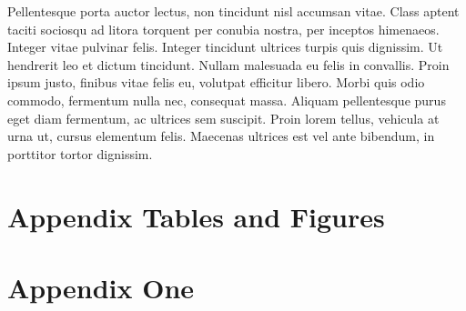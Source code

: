 \documentclass[12pt]{article}
\begin{document}
Pellentesque porta auctor lectus, non tincidunt nisl accumsan vitae. Class aptent taciti sociosqu ad litora torquent per conubia nostra, per inceptos himenaeos. Integer vitae pulvinar felis. Integer tincidunt ultrices turpis quis dignissim. Ut hendrerit leo et dictum tincidunt. Nullam malesuada eu felis in convallis. Proin ipsum justo, finibus vitae felis eu, volutpat efficitur libero. Morbi quis odio commodo, fermentum nulla nec, consequat massa. Aliquam pellentesque purus eget diam fermentum, ac ultrices sem suscipit. Proin lorem tellus, vehicula at urna ut, cursus elementum felis. Maecenas ultrices est vel ante bibendum, in porttitor tortor dignissim.




\clearpage
\begin{singlespace}
%
%


\end{singlespace}


\clearpage{}
{}
\processdelayedfloats

\restoregeometry

\makeatletter 
 \efloat@restorefloats 
 \makeatother


\newpage
\appendix
\setcounter{table}{0}
\renewcommand{\tablename}{Appendix Table}
\renewcommand{\figurename}{Appendix Figure}
\renewcommand{\thetable}{A\arabic{table}}
\setcounter{figure}{0}
\renewcommand{\thefigure}{A\arabic{figure}}

\section{Appendix Tables and Figures}


\newpage 
\section{Appendix One \label{sec:appendix:first}}
\renewcommand{\thetable}{B\arabic{table}}
\setcounter{table}{0}
\renewcommand{\thefigure}{B\arabic{figure}}
\setcounter{figure}{0}
\end{document}
